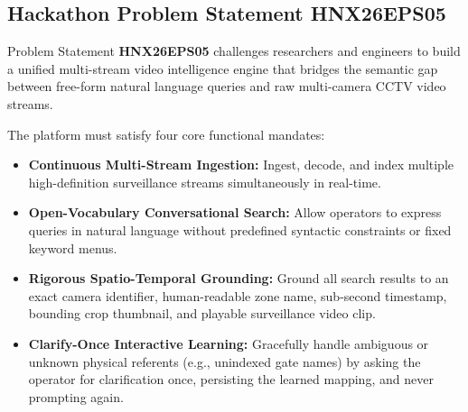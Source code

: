 \documentclass[12pt,a4paper]{article}
\begin{document}
\subsection{Hackathon Problem Statement HNX26EPS05}
Problem Statement \textbf{HNX26EPS05} challenges researchers and engineers to build a unified multi-stream video intelligence engine that bridges the semantic gap between free-form natural language queries and raw multi-camera CCTV video streams.

The platform must satisfy four core functional mandates:
\begin{itemize}
    \item \textbf{Continuous Multi-Stream Ingestion:} Ingest, decode, and index multiple high-definition surveillance streams simultaneously in real-time.
    \item \textbf{Open-Vocabulary Conversational Search:} Allow operators to express queries in natural language without predefined syntactic constraints or fixed keyword menus.
    \item \textbf{Rigorous Spatio-Temporal Grounding:} Ground all search results to an exact camera identifier, human-readable zone name, sub-second timestamp, bounding crop thumbnail, and playable surveillance video clip.
    \item \textbf{Clarify-Once Interactive Learning:} Gracefully handle ambiguous or unknown physical referents (e.g., unindexed gate names) by asking the operator for clarification once, persisting the learned mapping, and never prompting again.
\end{itemize}
\end{document}
